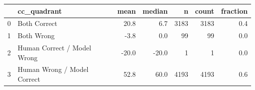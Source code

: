\begin{tabular}{llrrrrr}
\toprule
 & cc_quadrant & mean & median & n & count & fraction \\
\midrule
0 & Both Correct & 20.8 & 6.7 & 3183 & 3183 & 0.4 \\
1 & Both Wrong & -3.8 & 0.0 & 99 & 99 & 0.0 \\
2 & Human Correct / Model Wrong & -20.0 & -20.0 & 1 & 1 & 0.0 \\
3 & Human Wrong / Model Correct & 52.8 & 60.0 & 4193 & 4193 & 0.6 \\
\bottomrule
\end{tabular}
